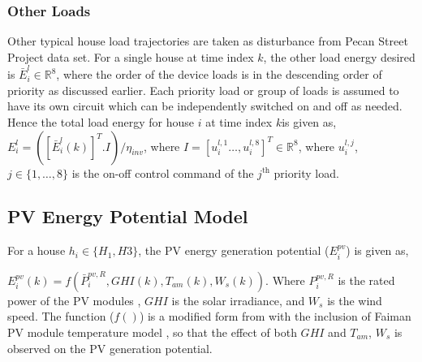 \documentclass[11pt,usenames]{article}
\begin{document}
\subsubsection{Other Loads}\label{subsubsection:OtherLoads}
Other typical house load trajectories are taken as disturbance from Pecan Street Project data set. For a single house at time index $k$, the other load energy desired is $\bar E_{i}^{l} \in \mathbb{R}^{8}$, where the order of the device loads is in the descending order of priority as discussed earlier. Each priority load or group of loads is assumed to have its own circuit which can be independently switched on and off as needed. Hence the total load energy for house $i$ at time index $k$is given as, $E_{i}^{l}=(\left[  \bar E_{i}^{l}(k) \right] ^{T}.I)/\eta_{inv}$, where $I=[u_{i}^{l,1}\dots,u_{i}^{l,8}]^{T} \in \mathbb{R}^{8}$, where $u_{i}^{l,j}$, $j \in \{1,\dots,8\}$ is the on-off control command of the $j^{\text{th}}$ priority load.


\subsection{PV Energy Potential Model}\label{subsection:PVEnergyPotentialModel}
For a house $h_{i} \in \{H_{1}, H{3}\}$, the PV energy generation potential ($E_{i}^{pv}$) is given as, 

$E_{i}^{pv}(k)=f(\bar P_{i}^{pv,R},GHI(k),T_{am}(k), W_{s}(k))$. Where $P_{i}^{pv,R}$ is the rated power of the PV modules , $GHI$ is the solar irradiance, and $W_{s}$ is the wind speed. The function ($f()$) is a modified form from \cite{MastersRenewable:2013} with the inclusion of Faiman PV module temperature model \cite{FaimanAssessing:2008}, so that the effect of both $GHI$ and $T_{am}$, $W_{s}$ is observed on the PV generation potential.
\end{document}
